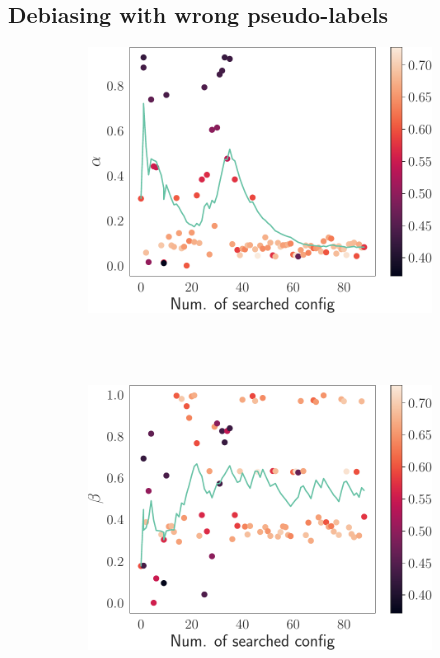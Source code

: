 \subsection{Debiasing with wrong pseudo-labels}
\label{extra:debias-on-wrong-bias}


\begin{figure}
    \centering
    \begin{subfigure}{0.8\columnwidth}
        \centering
        \includegraphics[width=1\columnwidth]{appendix/img/alpha_time.pdf}
        \caption{~}
        \label{fig:alpha-vs-time}
    \end{subfigure}\\[1em]
    \begin{subfigure}{0.8\columnwidth}
        \centering
        \includegraphics[width=1\columnwidth]{appendix/img/beta_time.pdf}
        \caption{~}
        \label{fig:beta-vs-time}
    \end{subfigure}


\end{figure}
